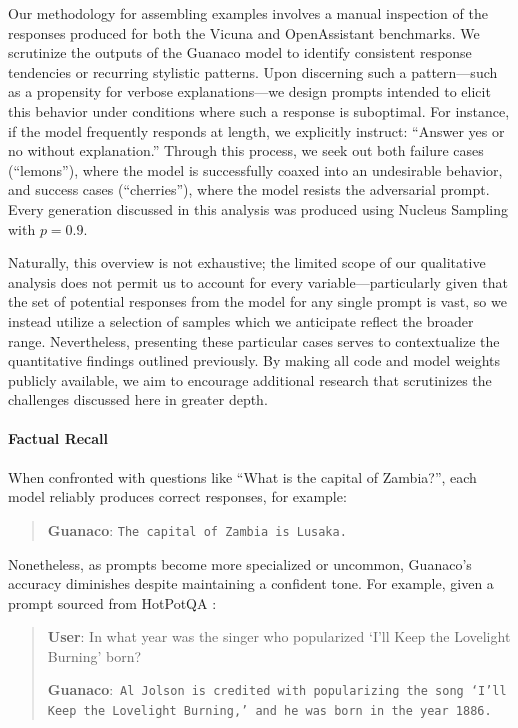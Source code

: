 Our methodology for assembling examples involves a manual inspection of the responses produced for both the Vicuna and OpenAssistant benchmarks. We scrutinize the outputs of the {Guanaco} model to identify consistent response tendencies or recurring stylistic patterns. Upon discerning such a pattern—such as a propensity for verbose explanations—we design prompts intended to elicit this behavior under conditions where such a response is suboptimal. For instance, if the model frequently responds at length, we explicitly instruct: ``Answer yes or no without explanation.'' Through this process, we seek out both failure cases (“lemons”), where the model is successfully coaxed into an undesirable behavior, and success cases (“cherries”), where the model resists the adversarial prompt. Every generation discussed in this analysis was produced using Nucleus Sampling \cite{holtzmancurious} with $p=0.9$.

Naturally, this overview is not exhaustive; the limited scope of our qualitative analysis does not permit us to account for every variable—particularly given that the set of potential responses from the model for any single prompt is vast, so we instead utilize a selection of samples which we anticipate reflect the broader range. Nevertheless, presenting these particular cases serves to contextualize the quantitative findings outlined previously. By making all code and model weights publicly available, we aim to encourage additional research that scrutinizes the challenges discussed here in greater depth.

\paragraph{Factual Recall} When confronted with questions like ``What is the capital of Zambia?'', each model reliably produces correct responses, for example:

\begin{quote} 
    \textbf{Guanaco}:
    \texttt{The capital of Zambia is Lusaka.}
\end{quote}

Nonetheless, as prompts become more specialized or uncommon, {Guanaco}'s accuracy diminishes despite maintaining a confident tone. For example, given a prompt sourced from HotPotQA \citep{yang2018hotpotqa}:

\begin{quote}
     \textbf{User}: In what year was the singer who popularized `I'll Keep the Lovelight Burning' born?  

     \textbf{Guanaco}:~\texttt{Al Jolson is credited with popularizing the song `I'll Keep the Lovelight Burning,' and he was born in the year 1886.}
 \end{quote}

